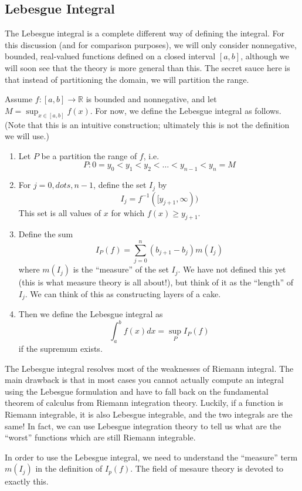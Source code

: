 \documentclass[12pt]{amsart}         %
\theoremstyle{remark}
\newcommand{\R}{\mathbb{R}}
\begin{document}
\subsection{Lebesgue Integral}

The Lebesgue integral is a complete different way of defining the integral. For this discussion (and for comparison purposes), we will only consider nonnegative, bounded, real-valued functions defined on a closed interval $[a, b]$, although we will soon see that the theory is more general than this. The secret sauce here is that instead of partitioning the domain, we will partition the range.

Assume $f:[a,b] \rightarrow \R$ is bounded and nonnegative, and let $M = \sup_{x \in [a,b]} f(x)$. For now, we define the Lebesgue integral as follows. (Note that this is an intuitive construction; ultimately this is not the definition we will use.)
\begin{enumerate}
\item Let $P$ be a partition the range of $f$, i.e.
\[
P : 0 = y_0 < y_1 < y_2 < \dots < y_{n-1} < y_n = M
\]
\item For $j = 0, dots, n-1$, define the set $I_j$ by
\[
I_j = f^{-1}([y_{j+1}, \infty))
\]
This set is all values of $x$ for which $f(x) \geq y_{j+1}$.
\item Define the sum
\[
I_P(f) = \sum_{j=0}^{n}(b_{j+1}-b_{j})m(I_j)
\]
where $m(I_j)$ is the ``measure'' of the set $I_j$. We have not defined this yet (this is what measure theory is all about!), but think of it as the ``length'' of $I_j$.  We can think of this as constructing layers of a cake. 
\item Then we define the Lebesgue integral as
\[
\int_{a}^{b}f(x)dx = \sup_P I_P(f)
\]
if the supremum exists.
\end{enumerate}

The Lebesgue integral resolves most of the weaknesses of Riemann integral. The main drawback is that in most cases you cannot actually compute an integral using the Lebesgue formulation and have to fall back on the fundamental theorem of calculus from Riemann integration theory. Luckily, if a function is Riemann integrable, it is also Lebesgue integrable, and the two integrals are the same! In fact, we can use Lebesgue integration theory to tell us what are the ``worst'' functions which are still Riemann integrable.

In order to use the Lebesgue integral, we need to understand the ``measure'' term $m(I_j)$ in the definition of $I_p(f)$. The field of mesaure theory is devoted to exactly this.
\end{document}
